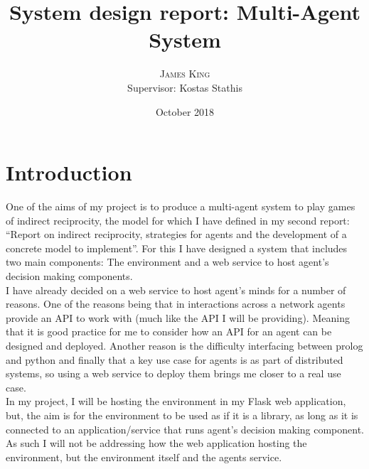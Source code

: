\documentclass[twoside,twocolumn]{article}
\title{System design report: Multi-Agent System} %
\author{%
\textsc{James King} \\%
\normalsize Supervisor: Kostas Stathis \\ %
}
\date{October 2018} %
\begin{document}

\maketitle


\section{Introduction}
One of the aims of my project is to produce a multi-agent system to play games of indirect reciprocity, the model for which I have defined in my second report: ``Report on indirect reciprocity, strategies for agents and the development of a concrete model to implement''. For this I have designed a system that includes two main components: The environment and a web service to host agent's decision making components.\\
I have already decided on a web service to host agent's minds for a number of reasons. One of the reasons being that in interactions across a network agents provide an API to work with (much like the API I will be providing). Meaning that it is good practice for me to consider how an API for an agent can be designed and deployed. Another reason is the difficulty interfacing between prolog and python and finally that a key use case for agents is as part of distributed systems, so using a web service to deploy them brings me closer to a real use case.\\
In my project, I will be hosting the environment in my Flask web application, but, the aim is for the environment to be used as if it is a library, as long as it is connected to an application/service that runs agent's decision making component. As such I will not be addressing how the web application hosting the environment, but the environment itself and the agents service.
\end{document}
